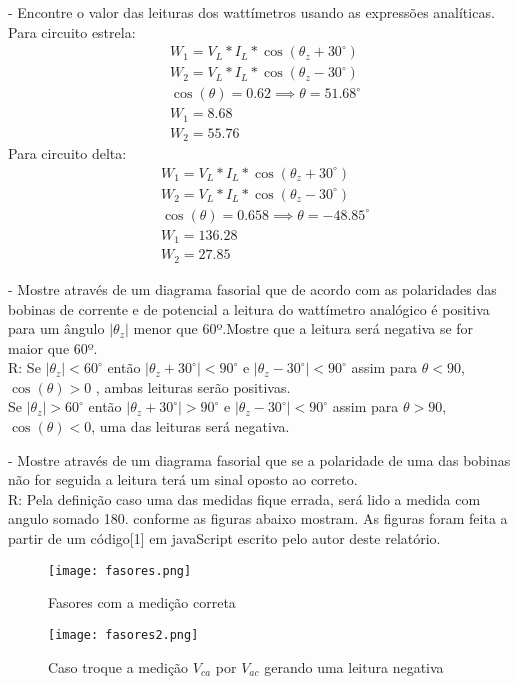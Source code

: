 \documentclass[a4paper, 12pt]{article}
\begin{document}
	- Encontre o valor das leituras dos wattímetros usando as expressões analíticas.\\
	Para circuito estrela:\\
	
	\[\begin{split}
		&W_1 = V_L\ast I_L \ast \cos(\theta _z + 30^\circ) \\
		&W_2 = V_L\ast I_L \ast \cos(\theta _z - 30^\circ)\\
		&\cos(\theta) = 0.62 \implies \theta = 51.68 ^\circ\\
		&W_1 = 8.68\\
		&W_2 = 55.76
	\end{split}
	\]
	Para circuito delta:\\
	
	\[\begin{split}
		&W_1 = V_L\ast I_L \ast \cos(\theta _z + 30^\circ) \\
		&W_2 = V_L\ast I_L \ast \cos(\theta _z - 30^\circ)\\
		&\cos(\theta) = 0.658 \implies \theta = -48.85 ^\circ\\
		&W_1 = 136.28\\
		&W_2 = 27.85
	\end{split}
	\]
	
	- Mostre através de um diagrama fasorial que de acordo com as polaridades das bobinas
	de corrente e de potencial a leitura do wattímetro analógico é positiva para um ângulo $\left| \theta_z \right|$ menor que 60º.Mostre que a leitura será negativa se  for maior que 60º.\\
	R: Se $\left|\theta_z\right| < 60^\circ$ então $\left |\theta_z + 30^\circ\right| < 90^\circ$ e
	$\left| \theta_z - 30^\circ \right| < 90^\circ$ assim para $\theta < 90$, $\cos(\theta) > 0$ , ambas leituras serão positivas.\\
	Se $\left|\theta_z\right| > 60^\circ$ então $\left |\theta_z + 30^\circ\right| > 90^\circ$ e
	$\left| \theta_z - 30^\circ \right| < 90^\circ$ assim para $\theta > 90$, $\cos(\theta) < 0$, uma das leituras será negativa.
	
	
	
	
	
	
	- Mostre através de um diagrama fasorial que se a polaridade de uma das bobinas não
	for seguida a leitura terá um sinal oposto ao correto.\\
	R: Pela definição caso uma  das medidas fique errada, será lido a medida com angulo somado 180. conforme as figuras abaixo mostram. As figuras foram feita a partir de um código[1] em javaScript escrito pelo autor deste relatório.
	\begin{figure}[H]
		\centering %
		\texttt{[image: fasores.png]}
		\caption{Fasores com a medição correta}
	\end{figure}
	\begin{figure}[H]
		\centering %
		\texttt{[image: fasores2.png]}
		\caption{Caso troque a medição $V_{ca}$ por $V_{ac}$ gerando uma leitura negativa}
	\end{figure}
	
\end{document}
